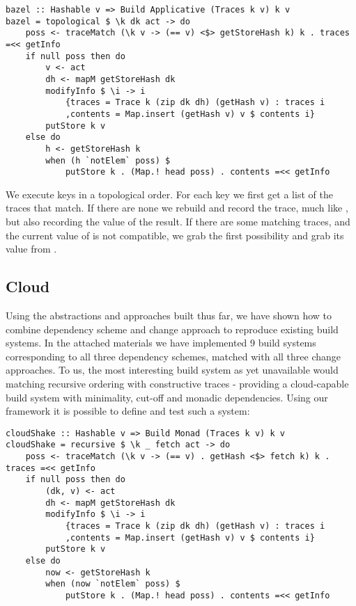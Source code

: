 \begin{verbatim}
bazel :: Hashable v => Build Applicative (Traces k v) k v
bazel = topological $ \k dk act -> do
    poss <- traceMatch (\k v -> (== v) <$> getStoreHash k) k . traces =<< getInfo
    if null poss then do
        v <- act
        dh <- mapM getStoreHash dk
        modifyInfo $ \i -> i
            {traces = Trace k (zip dk dh) (getHash v) : traces i
            ,contents = Map.insert (getHash v) v $ contents i}
        putStore k v
    else do
        h <- getStoreHash k
        when (h `notElem` poss) $
            putStore k . (Map.! head poss) . contents =<< getInfo
\end{verbatim}

We execute keys in a topological order. For each key we first get a list of the traces that match. If there are none we rebuild and record the trace, much like \Shake, but also recording the value of the result. If there are some matching traces, and the current value of  is not compatible, we grab the first possibility and grab its value from .

\subsection{Cloud \Shake}\label{sec-implementation-cloud-shake}


Using the abstractions and approaches built thus far, we have shown how to combine dependency scheme and change approach to reproduce existing build systems. In the attached materials we have implemented 9 build systems corresponding to all three dependency schemes, matched with all three change approaches. To us, the most interesting build system as yet unavailable would matching recursive ordering with constructive traces - providing a cloud-capable build system with minimality, cut-off and monadic dependencies. Using our framework it is possible to define and test such a system:

\begin{verbatim}
cloudShake :: Hashable v => Build Monad (Traces k v) k v
cloudShake = recursive $ \k _ fetch act -> do
    poss <- traceMatch (\k v -> (== v) . getHash <$> fetch k) k . traces =<< getInfo
    if null poss then do
        (dk, v) <- act
        dh <- mapM getStoreHash dk
        modifyInfo $ \i -> i
            {traces = Trace k (zip dk dh) (getHash v) : traces i
            ,contents = Map.insert (getHash v) v $ contents i}
        putStore k v
    else do
        now <- getStoreHash k
        when (now `notElem` poss) $
            putStore k . (Map.! head poss) . contents =<< getInfo
\end{verbatim}

